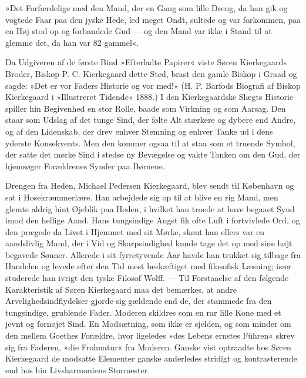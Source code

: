 \documentclass[12pt,a4paper,openany]{book}
\newcommand{\opage}[1]{\marginnote{\footnotesize\textit{[#1]}}}
\begin{document}
»Det Forfærdelige med den Mand, der en Gang som
lille Dreng, da han gik og vogtede Faar paa den jyske
Hede, led meget Ondt, sultede og var forkommen, paa en
Høj stod op og forbandede Gud --- og den Mand var
ikke i Stand til at glemme det, da han var 82 gammel«.

Da Udgiveren af de første Bind »Efterladte Papirer«
viste Søren Kierkegaards Broder, Biskop P. C. Kierkegaard
dette Sted, brast den gamle Biskop i Graad og
sagde: »Det er vor Faders Historie og vor med!«
(H. P. Barfods Biografi af Biskop Kierkegaard i »Illustreret
Tidende« 1888.) I den Kierkegaardske Slægts
Historie spiller hin Begivenhed en stor Rolle, baade som
Virkning og som Aarsag. Den staar som Udslag af det
tunge Sind, der følte Alt stærkere og dybere end Andre,
og af den Lidenskab, der drev enhver Stemning og enhver
Tanke ud i dens yderste Konsekvents. Men den
kommer ogsaa til at staa som et truende Symbol, der
satte det mørke Sind i stedse ny Bevægelse og vakte
Tanken om den Gud, der hjemsøger Forældrenes Synder
paa Børnene.

Drengen fra Heden, Michael Pedersen Kierkegaard,
blev sendt til København og sat i Hosekræmmerlære.
Han arbejdede sig op til at blive en rig Mand, men
glemte aldrig hint Øjeblik paa Heden, i hvilket han
troede at have begaaet Synd imod den hellige Aand.
Hans tungsindige Angst fik ofte Luft i fortvivlede Ord,
og den prægede da Livet i Hjemmet med sit Mørke,
\opage{30}skønt han ellers var en aandslivlig Mand, der i Vid og
Skarpsindighed kunde tage det op med sine højt begavede
Sønner. Allerede i sit fyrretyvende Aar havde han
trukket sig tilbage fra Handelen og levede efter den
Tid mest beskæftiget med filosofisk Læsning; især studerede
han ivrigt den tyske Filosof Wolff. --- Til Forstaaelse
af den følgende Karakteristik af Søren Kierkegaard
maa det bemærkes, at andre Arvelighedsindflydelser
gjorde sig gældende end de, der stammede fra den tungsindige,
grublende Fader. Moderen skildres som en rar
lille Kone med et jevnt og fornøjet Sind. En Modsætning,
som ikke er sjelden, og som minder om den mellem
Goethes Forældre, hvor ligeledes »des Lebens ernstes
Führen« skrev sig fra Faderen, »die Frohnatur« fra
Moderen. Ganske vist optraadte hos Søren Kierkegaard
de modsatte Elementer ganske anderledes stridigt og
kontrasterende end hos hin Livsharmoniens Stormester.
\end{document}
